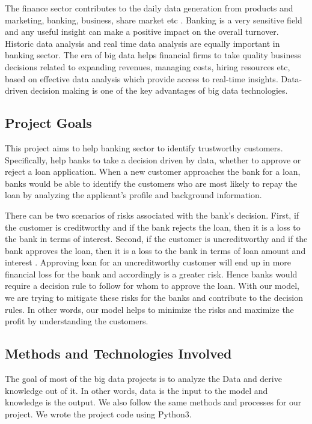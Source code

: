 \documentclass[sigconf]{acmart}
\begin{document}
The finance sector contributes to the daily data generation from products and marketing, banking, business, share market etc \cite{how-big-data-has-changed-finance}. Banking is a very sensitive field and any useful insight can make a positive impact on the overall turnover. Historic data analysis and real time data analysis are equally important in banking sector. The era of big data helps financial firms to take quality business decisions related to expanding revenues, managing costs, hiring resources etc, based on effective data analysis which provide access to real-time insights. Data-driven decision making is one of the key advantages of big data technologies.

\subsection{Project Goals}\label{Project goals}

This project aims to help banking sector to identify trustworthy customers. Specifically, help banks to take a decision driven by data, whether to approve or reject a loan application. When a new customer approaches the bank for a loan, banks would be able to identify the customers who are most likely to repay the loan by analyzing the applicant's profile and background information. 

There can be two scenarios of risks associated with the bank's decision. First, if the customer is creditworthy and if the bank rejects the loan, then it is a loss to the bank in terms of interest. Second, if the customer is uncreditworthy and if the bank approves the loan, then it is a loss to the bank in terms of loan amount and interest \cite{psu-site}. Approving loan for an uncreditworthy customer will end up in more financial loss for the bank and accordingly is a greater risk. Hence banks would require a decision rule to follow for whom to approve the loan. With our model, we are trying to mitigate these risks for the banks and contribute to the decision rules. In other words, our model helps to minimize the risks and maximize the profit by understanding the customers.

\subsection{Methods and Technologies Involved}\label{Methods and Technologies Involved}

The goal of most of the big data projects is to analyze the Data and derive knowledge out of it. In other words, data is the input to the model and knowledge is the output. We also follow the same methods and processes for our project. We wrote the project code using Python3. 
\end{document}
